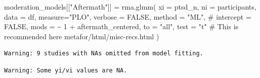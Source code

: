 \documentclass[
  letterpaper,
  DIV=11,
  numbers=noendperiod]{scrartcl}
\newenvironment{Shaded}{\begin{snugshade}}{\end{snugshade}}
\newcommand{\AttributeTok}[1]{\textcolor[rgb]{0.40,0.45,0.13}{#1}}
\newcommand{\CommentTok}[1]{\textcolor[rgb]{0.37,0.37,0.37}{#1}}
\newcommand{\ConstantTok}[1]{\textcolor[rgb]{0.56,0.35,0.01}{#1}}
\newcommand{\DecValTok}[1]{\textcolor[rgb]{0.68,0.00,0.00}{#1}}
\newcommand{\FunctionTok}[1]{\textcolor[rgb]{0.28,0.35,0.67}{#1}}
\newcommand{\NormalTok}[1]{\textcolor[rgb]{0.00,0.23,0.31}{#1}}
\newcommand{\OtherTok}[1]{\textcolor[rgb]{0.00,0.23,0.31}{#1}}
\newcommand{\SpecialCharTok}[1]{\textcolor[rgb]{0.37,0.37,0.37}{#1}}
\newcommand{\StringTok}[1]{\textcolor[rgb]{0.13,0.47,0.30}{#1}}
\begin{document}
\begin{Shaded}
\begin{Highlighting}[]
\NormalTok{moderation\_models[[}\StringTok{"Aftermath"}\NormalTok{]] }\OtherTok{=} \FunctionTok{rma.glmm}\NormalTok{(}
  \AttributeTok{xi =} \StringTok{\textasciigrave{}}\AttributeTok{ptsd\_n}\StringTok{\textasciigrave{}}\NormalTok{, }
  \AttributeTok{ni =} \StringTok{\textasciigrave{}}\AttributeTok{participants}\StringTok{\textasciigrave{}}\NormalTok{, }
  \AttributeTok{data =}\NormalTok{ df, }
  \AttributeTok{measure=}\StringTok{"PLO"}\NormalTok{,}
  \AttributeTok{verbose =} \ConstantTok{FALSE}\NormalTok{,}
  \AttributeTok{method =} \StringTok{"ML"}\NormalTok{,}
  \CommentTok{\# intercept = FALSE,}
  \AttributeTok{mods =} \SpecialCharTok{\textasciitilde{}} \DecValTok{1} \SpecialCharTok{+}\NormalTok{ aftermath\_centered,}
  \AttributeTok{to =} \StringTok{"all"}\NormalTok{,}
  \AttributeTok{test =} \StringTok{"t"} \CommentTok{\# This is recommended here metafor/html/misc{-}recs.html}
\NormalTok{)}
\end{Highlighting}
\end{Shaded}

\begin{verbatim}
Warning: 9 studies with NAs omitted from model fitting.
\end{verbatim}

\begin{verbatim}
Warning: Some yi/vi values are NA.
\end{verbatim}
\end{document}
